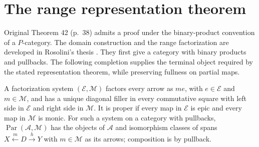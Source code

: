 \documentclass[11pt]{article}
\begin{document}
\section{The range representation theorem}\label{sec:range-representation}
Original Theorem 42 (p.~38) admits a proof under the binary-product convention of a $P$-category. The domain construction and the range factorization are developed in Rosolini's thesis \cite[Sections 2.3--2.5]{RT}. They first give a category with binary products and pullbacks. The following completion supplies the terminal object required by the stated representation theorem, while preserving fullness on partial maps.

A factorization system $(\mathcal E,\mathcal M)$ factors every arrow as $me$, with $e\in\mathcal E$ and $m\in\mathcal M$, and has a unique diagonal filler in every commutative square with left side in $\mathcal E$ and right side in $\mathcal M$. It is proper if every map in $\mathcal E$ is epic and every map in $\mathcal M$ is monic. For such a system on a category with pullbacks, $\operatorname{Par}(\mathcal A,\mathcal M)$ has the objects of $\mathcal A$ and isomorphism classes of spans $X\xleftarrow{m}D\xrightarrow{h}Y$ with $m\in\mathcal M$ as its arrows; composition is by pullback.
\end{document}
